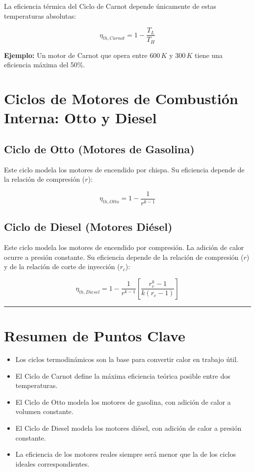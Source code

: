 \documentclass{article}
\begin{document}
La eficiencia térmica del Ciclo de Carnot depende únicamente de estas temperaturas absolutas:

$$ \eta_{th,Carnot} = 1 - \frac{T_L}{T_H} $$

\textbf{Ejemplo:} Un motor de Carnot que opera entre $600 \, K$ y $300 \, K$ tiene una eficiencia máxima del 50\%.

\section*{Ciclos de Motores de Combustión Interna: Otto y Diesel}

\subsection*{Ciclo de Otto (Motores de Gasolina)}

Este ciclo modela los motores de encendido por chispa. Su eficiencia depende de la relación de compresión ($r$):

$$ \eta_{th,Otto} = 1 - \frac{1}{r^{k-1}} $$

\subsection*{Ciclo de Diesel (Motores Diésel)}

Este ciclo modela los motores de encendido por compresión. La adición de calor ocurre a presión constante. Su eficiencia depende de la relación de compresión ($r$) y de la relación de corte de inyección ($r_c$):

$$   \eta_{th,Diesel} = 1 - \frac{1}{r^{k-1}} \left[ \frac{r_c^k - 1}{k(r_c - 1)} \right]  $$

\vspace{5mm}
\hrule
\vspace{5mm}

\section*{Resumen de Puntos Clave}

\begin{itemize}
    \item Los ciclos termodinámicos son la base para convertir calor en trabajo útil.
    \item El Ciclo de Carnot define la máxima eficiencia teórica posible entre dos temperaturas.
    \item El Ciclo de Otto modela los motores de gasolina, con adición de calor a volumen constante.
    \item El Ciclo de Diesel modela los motores diésel, con adición de calor a presión constante.
    \item La eficiencia de los motores reales siempre será menor que la de los ciclos ideales correspondientes.
\end{itemize}
\end{document}
